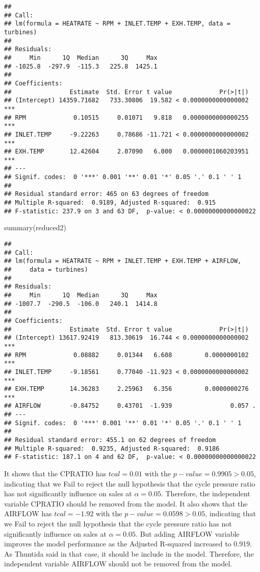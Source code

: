 \documentclass[
]{article}
\newenvironment{Shaded}{\begin{snugshade}}{\end{snugshade}}
\newcommand{\FunctionTok}[1]{\textcolor[rgb]{0.00,0.00,0.00}{#1}}
\newcommand{\NormalTok}[1]{#1}
\begin{document}
\begin{verbatim}
## 
## Call:
## lm(formula = HEATRATE ~ RPM + INLET.TEMP + EXH.TEMP, data = turbines)
## 
## Residuals:
##     Min      1Q  Median      3Q     Max 
## -1025.8  -297.9  -115.3   225.8  1425.1 
## 
## Coefficients:
##                Estimate  Std. Error t value             Pr(>|t|)    
## (Intercept) 14359.71682   733.30806  19.582 < 0.0000000000000002 ***
## RPM             0.10515     0.01071   9.818   0.0000000000000255 ***
## INLET.TEMP     -9.22263     0.78686 -11.721 < 0.0000000000000002 ***
## EXH.TEMP       12.42604     2.07090   6.000   0.0000001060203951 ***
## ---
## Signif. codes:  0 '***' 0.001 '**' 0.01 '*' 0.05 '.' 0.1 ' ' 1
## 
## Residual standard error: 465 on 63 degrees of freedom
## Multiple R-squared:  0.9189, Adjusted R-squared:  0.915 
## F-statistic: 237.9 on 3 and 63 DF,  p-value: < 0.00000000000000022
\end{verbatim}

\begin{Shaded}
\begin{Highlighting}[]
\FunctionTok{summary}\NormalTok{(reduced2)}
\end{Highlighting}
\end{Shaded}

\begin{verbatim}
## 
## Call:
## lm(formula = HEATRATE ~ RPM + INLET.TEMP + EXH.TEMP + AIRFLOW, 
##     data = turbines)
## 
## Residuals:
##     Min      1Q  Median      3Q     Max 
## -1007.7  -290.5  -106.0   240.1  1414.8 
## 
## Coefficients:
##                Estimate  Std. Error t value             Pr(>|t|)    
## (Intercept) 13617.92419   813.30619  16.744 < 0.0000000000000002 ***
## RPM             0.08882     0.01344   6.608         0.0000000102 ***
## INLET.TEMP     -9.18561     0.77040 -11.923 < 0.0000000000000002 ***
## EXH.TEMP       14.36283     2.25963   6.356         0.0000000276 ***
## AIRFLOW        -0.84752     0.43701  -1.939                0.057 .  
## ---
## Signif. codes:  0 '***' 0.001 '**' 0.01 '*' 0.05 '.' 0.1 ' ' 1
## 
## Residual standard error: 455.1 on 62 degrees of freedom
## Multiple R-squared:  0.9235, Adjusted R-squared:  0.9186 
## F-statistic: 187.1 on 4 and 62 DF,  p-value: < 0.00000000000000022
\end{verbatim}

It shows that the CPRATIO has \(tcal=0.01\) with the
\(p-value= 0.9905 > 0.05\), indicating that we Fail to reject the null
hypothesis that the cycle pressure ratio has not significantly influence
on sales at \(α=0.05\). Therefore, the independent variable CPRATIO
should be removed from the model. It also shows that the AIRFLOW has
\(tcal=-1.92\) with the \(p-value= 0.0598 > 0.05\), indicating that we
Fail to reject the null hypothesis that the cycle pressure ratio has not
significantly influence on sales at \(α=0.05\). But adding AIRFLOW
variable improves the model performance as the Adjusted R-squared
increased to 0.919. As Thuntida said in that case, it should be include
in the model. Therefore, the independent variable AIRFLOW should not be
removed from the model.
\end{document}
